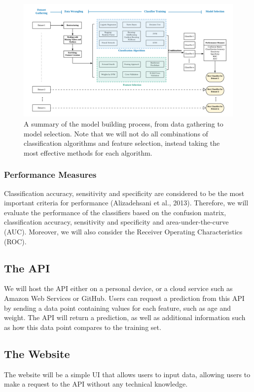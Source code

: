 \documentclass[a4paper, 12pt]{article}
\begin{document}
\begin{figure}[ht]
    \centering
    \includegraphics[width=1\textwidth]{Model.png}
    \caption{A summary of the model building process, from data gathering to model selection. Note that we will not do all combinations of classification algorithms and feature selection, instead taking the most effective methods for each algorithm.}
    \label{fig:model_summary}
\end{figure}

\subsubsection{Performance Measures}
Classification accuracy, sensitivity and specificity are considered to be the most important criteria for performance (Alizadehsani et al., 2013). Therefore, we will evaluate the performance of the classifiers based on the confusion matrix, classification accuracy, sensitivity and specificity and area-under-the-curve (AUC). Moreover, we will also consider the Receiver Operating Characteristics (ROC).

\subsection{The API}
We will host the API either on a personal device, or a cloud service such as Amazon Web Services or GitHub. Users can request a prediction from this API by sending a data point containing values for each feature, such as age and weight. The API will return a prediction, as well as additional information such as how this data point compares to the training set.

\subsection{The Website}
The website will be a simple UI that allows users to input data, allowing users to make a request to the API without any technical knowledge. 
\end{document}
